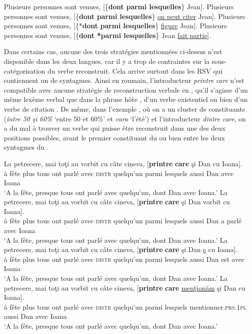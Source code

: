 \ea \label{ch3:ex88}
\ea 
Plusieurs personnes sont venues, [\{\textbf{dont {\textbar} parmi lesquelles}\} Jean]. \label{ch3:ex88a} 
\ex
Plusieurs personnes sont venues, [\{\textbf{dont {\textbar} parmi lesquelles}\} \uline{on peut citer} Jean]. \label{ch3:ex88b}
\ex 
Plusieurs personnes sont venues, [\{*\textbf{dont {\textbar} parmi lesquelles}\} \uline{figure} Jean]. \label{ch3:ex88c}
\ex 
Plusieurs personnes sont venues, [\{\textbf{dont {\textbar} *parmi lesquelles}\} Jean \uline{fait partie}]. \label{ch3:ex88d}
\z 
\z

Dans certains cas, aucune des trois stratégies mentionnées ci-dessus n’est disponible dans les deux langues, car il y a trop de contraintes sur la sous-catégorisa\-tion du verbe reconstruit. Cela arrive surtout dans les RSV qui contiennent un  de syntagmes. Ainsi en roumain, l’introducteur \textit{printre} \textit{care} n’est compatible avec aucune stratégie de reconstruction verbale en , qu’il s’agisse d’un même lexème verbal que dans la phrase hôte , d’un verbe existentiel  ou bien d’un verbe de citation . De même, dans l’exemple , où on a un cluster de constituants (\textit{între 50 şi 60\%} ‘entre 50 et 60\%’ et \textit{vara} ‘l’été’) et l’introducteur \textit{dintre care}, on a du mal à trouver un verbe qui puisse être reconstruit dans une des deux positions possibles, {\cad} avant le premier constituant du  ou bien entre les deux syntagmes du .  

\ea \label{ch3:ex89}
\ea 
\gll La  petrecere,  mai  toţi  au  vorbit  cu  câte  cineva,  [\textbf{printre} \textbf{care} şi  Dan  cu  Ioana]. \label{ch3:ex89a}\\
à  fête  plus  tous  ont  parlé  avec  \textsc{distr}  quelqu’un  parmi  lesquels aussi  Dan  avec  Ioana \\
\glt ‘A la fête, presque tous ont parlé avec quelqu’un, dont Dan avec Ioana.’
\ex 
\gll *La  petrecere,  mai  toţi  au  vorbit  cu  câte  cineva,  [\textbf{printre} \textbf{care} şi  Dan    vorbit  cu  Ioana]. \label{ch3:ex89b}\\
à  fête  plus  tous  ont  parlé  avec  \textsc{distr}  quelqu’un  parmi  lesquels aussi  Dan  a  parlé  avec  Ioana \\
\glt ‘A la fête, presque tous ont parlé avec quelqu’un, dont Dan avec Ioana.’
\ex 
\gll *La  petrecere,  mai  toţi  au  vorbit  cu  câte  cineva,  [\textbf{printre} \textbf{care} şi  Dan  \uline{e}  cu  Ioana]. \label{ch3:ex89c}\\
à  fête  plus  tous  ont  parlé  avec  \textsc{distr}  quelqu’un  parmi  lesquels aussi  Dan  est  avec  Ioana \\
\glt ‘A la fête, presque tous ont parlé avec quelqu’un, dont Dan avec Ioana.’
\ex 
\gll *La  petrecere,  mai  toţi  au  vorbit  cu  câte  cineva,  [\textbf{printre} \textbf{care} \uline{menţionăm}  şi  Dan  cu  Ioana]. \label{ch3:ex89d}\\
à  fête  plus  tous  ont  parlé  avec  \textsc{distr}  quelqu’un  parmi  lesquels mentionner.\textsc{prs.1pl}  aussi  Dan  avec  Ioana \\
\glt ‘A la fête, presque tous ont parlé avec quelqu’un, dont Dan avec Ioana.’
\z 
\z

